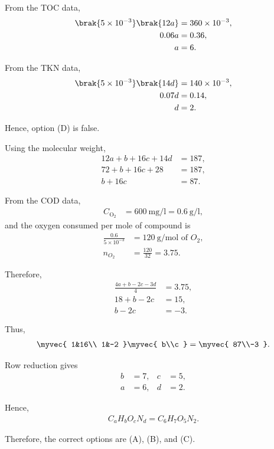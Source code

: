 \begin{enumerate}[label=\thesubsection.\arabic*, ref=\thesubsection.\theenumi,itemsep=0pt]
From the TOC data,
\begin{align}
\brak{5\times10^{-3}}\brak{12a}&=360\times10^{-3},\\
0.06a&=0.36,\\
a&=6.
\end{align}

From the TKN data,
\begin{align}
\brak{5\times10^{-3}}\brak{14d}&=140\times10^{-3},\\
0.07d&=0.14,\\
d&=2.
\end{align}

Hence, option (D) is false.

Using the molecular weight,
\begin{align}
12a+b+16c+14d&=187,\\
72+b+16c+28&=187,\\
b+16c&=87.
\end{align}

From the COD data,
\begin{align}
C_{\mathrm{O_2}}
&=600\ \text{mg/l}=0.6\ \text{g/l},
\end{align}
and the oxygen consumed per mole of compound is
\begin{align}
\frac{0.6}{5\times10^{-3}}
&=120\ \text{g/mol of }O_2,\\
n_{O_2}
&=\frac{120}{32}=3.75.
\end{align}

Therefore,
\begin{align}
\frac{4a+b-2c-3d}{4}&=3.75,\\
18+b-2c&=15,\\
b-2c&=-3.
\end{align}

Thus,
\begin{align}
\myvec{
1&16\\
1&-2
}
\myvec{
b\\c
}
=
\myvec{
87\\-3
}.
\end{align}

Row reduction gives
\begin{align}
b&=7, & c&=5,\\
a&=6, & d&=2.
\end{align}

Hence,
\begin{align}
C_aH_bO_cN_d=C_6H_7O_5N_2.
\end{align}

Therefore, the correct options are (A), (B), and (C).


\end{enumerate}
